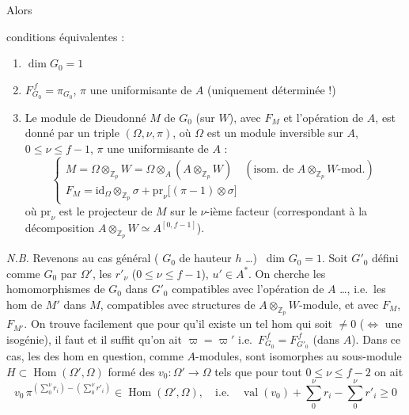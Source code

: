 \documentclass[11pt,a4paper]{article}
\begin{document}
Alors 

conditions équivalentes :
\begin{enumerate}
\item[(i)] $\dim G_0 = 1$
\item[(ii)] $F_{G_0}^{\,f} = \pi_{G_0}$, $\pi$ une uniformisante de $A$
(uniquement déterminée !)
\item[(iii)] Le module de Dieudonné $M$ de $G_0$ (sur $W$), avec $F_M$ et
l'opération de $A$, est donné par un triple $(\Omega, \nu, \pi)$, où
$\Omega$ est un module inversible sur $A$, $0 \le \nu \le f-1$, $\pi$ une
uniformisante de $A$ : 
\[
\begin{cases}
M = \Omega \otimes_{\mathbb{Z}_p} W = \Omega \otimes_A (A \otimes_{\mathbb{Z}_p} W)
\quad (\text{isom.\ de } A \otimes_{\mathbb{Z}_p} W\text{-mod.}) \\
F_M = \mathrm{id}_\Omega \otimes_{\mathbb{Z}_p} \sigma + \mathrm{pr}_\nu
\bigl[(\pi - 1) \otimes \sigma\bigr]
\end{cases}
\]
où $\mathrm{pr}_\nu$ est le  projecteur de $M$ sur le
$\nu$-ième facteur (correspondant à la décomposition
$A \otimes_{\mathbb{Z}_p} W \simeq A^{[0, f-1]}$).
\end{enumerate}


\emph{N.B.} Revenons au cas général (\ill{} $G_0$ de hauteur $h$ \ldots)
\ill{} \ dim $G_0 = 1$. Soit $G'_0$ défini comme $G_0$ par
$\Omega'$, les $r'_\nu$ ($0 \le \nu \le f-1$), $u' \in A^{*}$.
On cherche les homomorphismes de $G_0$ dans $G'_0$ compatibles avec
l'opération de $A$ \ldots, i.e.\ les hom de $M'$ dans $M$, compatibles avec
 structures de $A \otimes_{\mathbb{Z}_p} W$-module, et avec
$F_M$, $F_{M'}$. On trouve facilement que pour qu'il existe un tel hom qui
\struck{\ill{}} soit $\neq 0$ ($\iff$ une isogénie), il faut et il suffit
qu'on ait $\varpi = \varpi'$ i.e.\ $F_{G_0}^{\,f} = F_{G'_0}^{\,f}$ (dans $A$).
Dans ce cas, les  des hom en question, comme $A$-modules,
sont isomorphes au \struck{\ill{}} sous-module $H \subset \operatorname{Hom}(\Omega',
\Omega)$ formé des $v_0 : \Omega' \to \Omega$ tels que pour tout $0 \le \nu
\le f-2$ on ait
\[
v_0\, \pi^{(\sum_0^{\nu} r_i) - (\sum_0^{\nu} r'_i)} \in
\operatorname{Hom}(\Omega', \Omega), \quad \text{i.e.} \quad
\operatorname{val}(v_0) + \sum_0^{\nu} r_i - \sum_0^{\nu} r'_i \geq 0
\]
\end{document}
